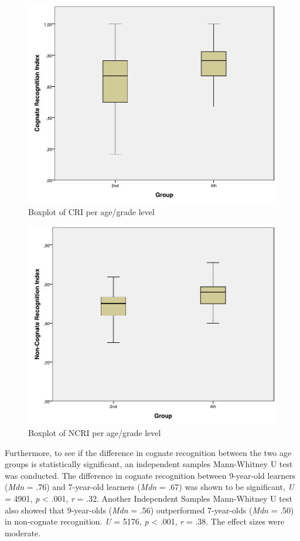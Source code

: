 \documentclass[output=paper,modfonts,nonflat,newtxmath]{langsci/langscibook}
\begin{document}
\begin{figure}[p]
\includegraphics[width=.75\textwidth]{figures/CRI.pdf}%
\caption{\label{fig:munoz:1}Boxplot of CRI per age/grade level}
\end{figure}

\begin{figure}[p]
\caption{\label{fig:munoz:2}Boxplot of NCRI per age/grade level}
\includegraphics[width=.75\textwidth]{figures/NCRI.pdf}%
\end{figure}

 {Furthermore, to see if the difference in cognate recognition between the two age groups is statistically significant, an independent samples Mann-Whitney U test was conducted. The difference in cognate recognition between 9-year-old learners (}{\textit{Mdn}} {= .76) and 7-year-old learners (}{\textit{Mdn}} {= .67) was shown to be significant,} {\textit{U}} {= 4901,} {\textit{p} }{< .001,} {\textit{r} }{= .32.  Another Independent Samples Mann-Whitney U test also showed that 9-year-olds (}{\textit{Mdn}} {= .56) outperformed 7-year-olds (}{\textit{Mdn}} {= .50) in non-cognate recognition.}{ \textit{U}} {= 5176,} {\textit{p} }{< .001,} {\textit{r} }{= .38. The effect sizes were moderate.}
\end{document}
